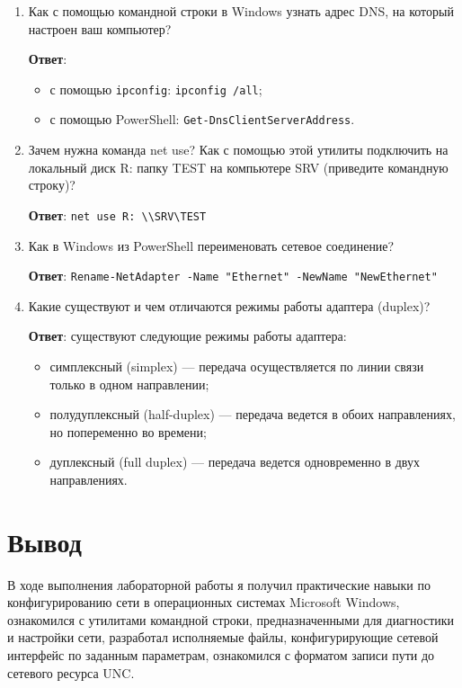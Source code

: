 \documentclass[a4paper, 14pt]{extarticle}
\begin{document}
\begin{enumerate}[leftmargin=*]
  \item Как с помощью командной строки в Windows узнать адрес DNS, на который
  настроен ваш компьютер?

  \textbf{Ответ}:
  \begin{itemize}
    \item с помощью \texttt{ipconfig}: \texttt{ipconfig /all};
    \item с помощью PowerShell: \texttt{Get-DnsClientServerAddress}.
  \end{itemize}
  \item Зачем нужна команда net use? Как с помощью этой утилиты подключить на
  локальный диск R: папку TEST на компьютере SRV (приведите командную
  строку)?

  \textbf{Ответ}: \texttt{net use R: \textbackslash\textbackslash SRV\textbackslash TEST}
  \item Как в Windows из PowerShell переименовать сетевое соединение?

  \textbf{Ответ}: \texttt{Rename-NetAdapter -Name "Ethernet" -NewName "NewEthernet"}
  \item Какие существуют и чем отличаются режимы работы адаптера (duplex)?

  \textbf{Ответ}: существуют следующие режимы работы адаптера:
  \begin{itemize}
    \item симплексный (simplex) — передача осуществляется по линии связи
    только в одном направлении;
    \item полудуплексный (half-duplex) — передача ведется в обоих
    направлениях, но попеременно во времени;
    \item дуплексный (full duplex) — передача ведется одновременно в двух
    направлениях.
  \end{itemize}
\end{enumerate}

\section{Вывод}

В ходе выполнения лабораторной работы я получил практические навыки по
конфигурированию сети в операционных системах Microsoft Windows, ознакомился с
утилитами командной строки, предназначенными для диагностики и настройки сети,
разработал исполняемые файлы, конфигурирующие сетевой интерфейс по заданным
параметрам, ознакомился с форматом записи пути до сетевого ресурса UNC.
\end{document}
